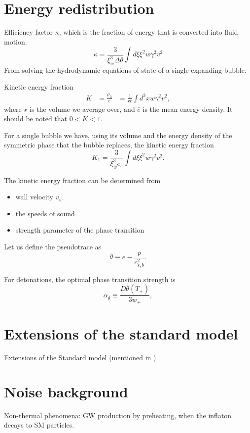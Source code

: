 \section{Energy redistribution}
Efficiency factor $\kappa$, which is the fraction of energy that is converted into fluid motion.
\begin{equation}
\kappa = \frac{3}{\xi_w^3 \Delta \theta} \int d\xi \xi^2 w \gamma^2 v^2
\end{equation}
From solving the hydrodynamic equations of state of a single expanding bubble.

Kinetic energy fraction
\cites[eq. 7.36]{lecture_notes}[eq. 5]{giese_2020}
\begin{align}
K
&= \frac{\rho_\text{fl}}{\bar{e}}
&= \frac{1}{\mathcal{v} \bar{e}} \int d^3 x w \gamma^2 v^2,
\end{align}
where $\mathcal{v}$ is the volume we average over, and $\bar{e}$ is the mean energy density.
It should be noted that $0 < K < 1$.
\cite{giese_2020}

For a single bubble we have, using its volume and the energy density of the symmetric phase that the bubble replaces, the kinetic energy fraction
\cites[eq. 7.37]{lecture_notes}[eq. 5]{giese_2020}
\begin{equation}
K_1 = \frac{3}{\xi_w^3 e_s} \int d\xi \xi^2 w \gamma^2 v^2.
\end{equation}

The kinetic energy fraction can be determined from
\begin{itemize}
\item wall velocity $v_w$
\item the speeds of sound
\item strength parameter of the phase transition
\end{itemize}

Let us define the pseudotrace as
\cites[eq. 34]{giese_2020}[eq. 1]{giese_2021}
\begin{equation}
\overline{\theta} \equiv e - \frac{p}{c_{s,b}^2}.
\end{equation}

For detonations, the optimal phase transition strength is
\cites[eq. 34]{giese_2020}[eq. 1]{giese_2021}
\begin{equation}
\alpha_{\overline{\theta}} \equiv \frac{D \overline{\theta}(T_+)}{3w_+},
\end{equation}


\section{Extensions of the standard model}
Extensions of the Standard model \cite{caprini_detecting_2020}
(mentioned in \cite[p. 14]{lecture_notes})

\section{Noise background}
Non-thermal phenomena: GW production by preheating, when the inflaton decays to SM particles.
\cite{lecture_notes}

